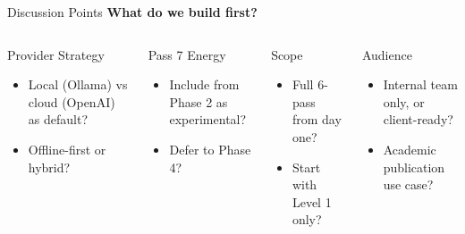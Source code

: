 \documentclass[11pt, aspectratio=169]{beamer}
\begin{document}
\begin{frame}{Discussion Points}
  \centering
  \Large\textbf{What do we build first?}

  \vspace{0.3cm}
  {\footnotesize
  \begin{columns}[T]
      \begin{block}{Provider Strategy}
        \begin{itemize}
          \item Local (Ollama) vs cloud (OpenAI) as default?
          \item Offline-first or hybrid?
        \end{itemize}
      \end{block}

      \vspace{0.2cm}
      \begin{block}{Pass 7 Energy}
        \begin{itemize}
          \item Include from Phase 2 as experimental?
          \item Defer to Phase 4?
        \end{itemize}
      \end{block}

      \begin{block}{Scope}
        \begin{itemize}
          \item Full 6-pass from day one?
          \item Start with Level 1 only?
        \end{itemize}
      \end{block}

      \vspace{0.2cm}
      \begin{block}{Audience}
        \begin{itemize}
          \item Internal team only, or client-ready?
          \item Academic publication use case?
        \end{itemize}
      \end{block}
  \end{columns}
  }
\end{frame}
\end{document}
